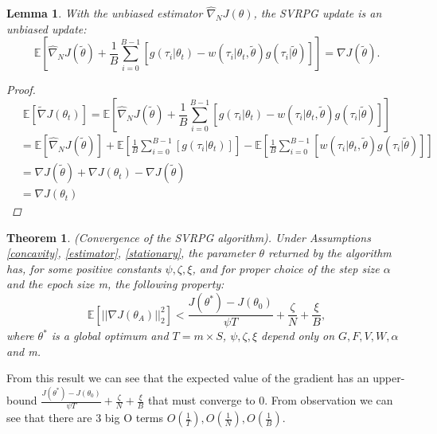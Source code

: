\newtheorem{lemma}{Lemma}

\begin{lemma}\label{SVRGunbiasupdate}
    With the unbiased estimator $\widehat{\nabla}_N J\left(\theta \right)$, the SVRPG update is an unbiased update:
    $$\mathbb{E}\left[\widehat{\nabla}_N J(\tilde{\theta}) + \frac{1}{B}\sum_{i=0}^{B-1}\left[g(\tau_i|\theta_t) - w(\tau_i|\theta_t, \tilde{\theta})g(\tau_i|\tilde{\theta}) \right]\right] = \nabla J(\tilde{\theta}).$$
    
\begin{proof}

    $$\mathbb{E}\left[\widetilde{\nabla} J(\theta_t)\right]=\mathbb{E}\left[\widehat{\nabla}_N J(\tilde{\theta}) + \frac{1}{B}\sum_{i=0}^{B-1}\left[g(\tau_i|\theta_t) - w(\tau_i|\theta_t, \tilde{\theta})g(\tau_i|\tilde{\theta}) \right]\right]$$
    \begin{align*}
    &= \mathbb{E}\left[\widehat{\nabla}_N J(\tilde{\theta})\right] + \mathbb{E}\left[\frac{1}{B}\sum_{i=0}^{B-1}\left[g(\tau_i|\theta_t)\right]\right]-\mathbb{E}\left[\frac{1}{B}\sum_{i=0}^{B-1}\left[w(\tau_i|\theta_t, \tilde{\theta})g(\tau_i|\tilde{\theta})\right]\right]\\
    &= \nabla J(\tilde{\theta}) + \nabla J(\theta_t) - \nabla J(\tilde{\theta})\\
    &= \nabla J(\theta_t)
    \end{align*}
\end{proof}

\end{lemma}


\newtheorem{theorem}{Theorem}
\begin{theorem}\label{convergence}
(Convergence of the SVRPG algorithm). Under Assumptions \ref{concavity}, \ref{estimator}, \ref{stationary}, the parameter $\theta$ returned by the algorithm has, for some positive constants $\psi, \zeta, \xi$, and for proper choice of the step size $\alpha$ and the epoch size m, the following property:
$$\mathbb{E}\left[||\nabla J(\theta_A)||_2^2\right] < \frac{J(\theta^*)-J(\theta_0)}{\psi T} + \frac{\zeta}{N} + \frac{\xi}{B},$$
where $\theta^*$ is a global optimum and $T=m\times S$, $\psi, \zeta, \xi$ depend only on
$G, F, V, W, \alpha $ and m.
\end{theorem}

From this result we can see that the expected value of the gradient has an upper-bound $\frac{J(\theta^*)-J(\theta_0)}{\psi T}+\frac{\zeta}{N}+\frac{\xi}{B}$ that must converge to 0. From observation we can see that there are 3 big O terms $O(\frac{1}{T}),O(\frac{1}{N}),O(\frac{1}{B})$.

